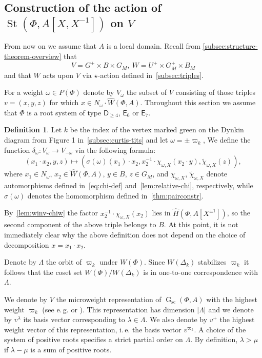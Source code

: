 \documentclass[oneside, 10pt]{amsart}
\DeclareMathOperator{\St}{St}
\DeclareMathOperator{\G}{G}
\newcommand{\Gsc}{\G_\mathrm{sc}}
\newcommand{\rD}{\mathsf{D}}
\newcommand{\rE}{\mathsf{E}}
\newcommand{\StW}{\widehat{W}}
\newcommand{\StH}{\widehat{H}}
\newcommand{\inv}{^{-1}}
\numberwithin{equation}{section}
\numberwithin{thm}{section}
\numberwithin{lemma}{section}
\theoremstyle{definition}
\newtheorem{dfn}[lemma]{Definition}
\theoremstyle{remark}
\begin{document}
\subsection{Construction of the action of $\St(\Phi, A[X, X\inv])$ on $V$} \label{sec:construction-delta}
From now on we assume that $A$ is a local domain.
Recall from \cref{subsec:structure-theorem-overview} that \[V = G^+ \times B \times G_M,\ W = U^+ \times G_M^+ \times B_M\]
and that $W$ acts upon $V$ via $\star$-action defined in~\cref{subsec:triples}.

For a weight $\omega \in P(\Phi)$ denote by $V_\omega$ the subset of $V$ consisting of those triples $v = (x, y, z)$ for which $x \in N_\omega\cdot \StW(\Phi, A)$.
Throughout this section we assume that $\Phi$ is a root system of type $\rD_{\geq 4}$, $\rE_6$ or $\rE_7$.

\begin{dfn} \label{sigma-def}
Let $k$ be the index of the vertex marked green on the Dynkin diagram from Figure 1 in~\cref{subsec:curtis-tits} and let $\omega = \pm \varpi_k$,
We define the function $\delta_\omega \colon V_\omega \to V_{-\omega}$ via the following formula:
\begin{equation} \label{eq:sigma-def} (x_1 \cdot x_2, y, z) \mapsto (\sigma(\omega)(x_1)\cdot x_2, x_2^{-1} \cdot \chi_{\omega, X}(x_2 \cdot y), \widetilde{\chi}_{\omega, X}(z)), \end{equation}
where $x_1 \in N_\omega$, $x_2 \in \StW(\Phi, A)$, $y \in B$, $z \in G_M$, and
$\chi_{\omega, X}$, $\widetilde{\chi}_{\omega, X}$ denote automorphisms defined in~\eqref{eq:chi-def} and~\cref{lem:relative-chi}, respectively,
while $\sigma(\omega)$ denotes the homomorphism defined in~\cref{thm:pairconstr}.
\end{dfn}
By~\cref{lem:winv-chiw} the factor $x_2^{-1} \cdot \chi_{\omega, X}(x_2)$ lies in $\StH(\Phi, A[X^{\pm 1}])$,
so the second component of the above triple belongs to $B$.
At this point, it is not immediately clear why the above definition does not depend on the choice of decomposition $x = x_1 \cdot x_2$.

Denote by $\Lambda$ the orbit of $\varpi_k$ under $W(\Phi)$.
Since $W(\Delta_k)$ stabilizes $\varpi_k$ it follows that the coset set $W(\Phi)/W(\Delta_k)$ is in one-to-one correspondence with $\Lambda$.

We denote by $V$ the microweight representation of $\Gsc(\Phi, A)$ with the highest weight $\varpi_k$ (see e.\,g. \cite[\S~2]{Ge17} or \cite[\S~1.1]{V00}).
This representation has dimension $|\Lambda|$ and we denote by $v^\lambda$ its basis vector corresponding to $\lambda \in \Lambda$.
We also denote by $v^+$ the highest weight vector of this representation, i.\,e. the basis vector $v^{\varpi_k}$.
A choice of the system of positive roots specifies a strict partial order on $\Lambda$.
By definition, $\lambda > \mu$ if $\lambda - \mu$ is a sum of positive roots.
\end{document}
